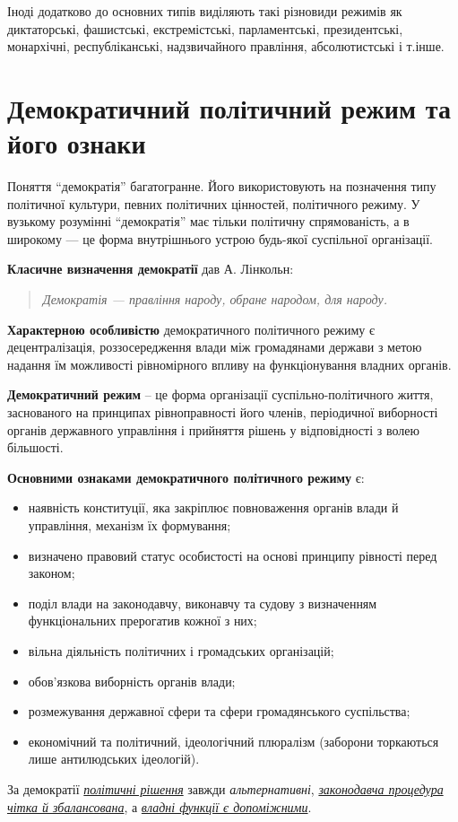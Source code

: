 Іноді додатково до основних типів виділяють такі різновиди режимів як диктаторські, фашистські, екстремістські, парламентські, президентські, монархічні, республіканські, надзвичайного правління, абсолютистські і т.інше.
\section{Демократичний  політичний режим та його ознаки}
Поняття “демократія” багатогранне. Його використовують на позначення типу політичної культури, певних політичних цінностей, політичного режиму. У вузькому розумінні “демократія” має тільки політичну спрямованість, а в широкому — це форма внутрішнього устрою будь-якої суспільної організації.

\textbf{Класичне визначення демократії} дав А. Лінкольн:
\begin{quotation}
\textit{Демократія — правління народу, обране народом, для народу.}
\end{quotation}
\textbf{Характерною особливістю} демократичного політичного режиму є децентралізація, роззосередження влади між громадянами держави з метою надання їм можливості рівномірного впливу на функціонування владних органів.

\textbf{Демократичний режим} – це форма організації суспільно-політичного життя, заснованого на принципах рівноправності його членів, періодичної виборності органів державного управління і прийняття рішень у відповідності з волею більшості.

\textbf{Основними ознаками демократичного політичного режиму} є:
\begin{itemize}
\item наявність конституції, яка закріплює повноваження органів влади й управління, механізм їх формування;
\item визначено правовий статус особистості на основі принципу рівності перед законом;
\item поділ влади на законодавчу, виконавчу та судову з визначенням функціональних прерогатив кожної з них;
\item вільна діяльність політичних і громадських організацій;
\item обов’язкова виборність органів влади;
\item розмежування державної сфери та сфери громадянського суспільства;
\item економічний та політичний, ідеологічний плюралізм (заборони торкаються лише антилюдських ідеологій).
\end{itemize}
За демократії \ul{\textit{політичні рішення}} завжди \textit{альтернативні}, \ul{\textit{законодавча процедура чітка й збалансована}}, а \ul{\textit{владні функції є допоміжними}}.

